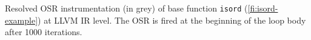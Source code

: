 \label{fig:isordfrom} Resolved OSR instrumentation (in grey) of base function {\tt isord} (\myfigure\ref{fi:isord-example}) at LLVM IR level. The OSR is fired at the beginning of the loop body after 1000 iterations.
